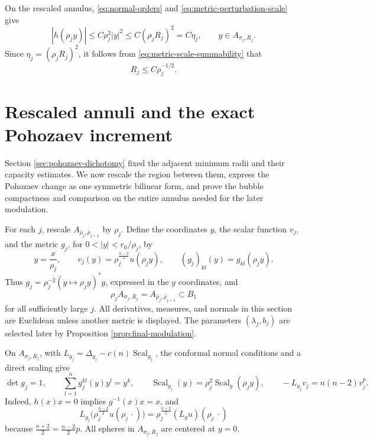 \documentclass[11pt]{article}
\numberwithin{equation}{section}
\theoremstyle{remark}
\begin{document}
{On the rescaled annulus, \eqref{eq:normal-orders} and
\eqref{eq:metric-perturbation-scale} give}
\[
 |h(\rho_jy)|
 \le C\rho_j^2|y|^2
 \le C(\rho_jR_j)^2
 =C\eta_j,
 \qquad y\in A_{\sigma_j,R_j}.
\]
{Since
\(\eta_j=(\rho_jR_j)^2\), it follows from
\eqref{eq:metric-scale-summability} that}
\begin{equation}\label{eq:outer-radius-rho-bound}
 R_j\le C\rho_j^{-1/2}.
\end{equation}

\section{Rescaled annuli and the exact Pohozaev increment}
\label{sec:euclidean-annuli}

{
Section  \ref{sec:pohozaev-dichotomy} fixed the adjacent minimum radii and
their capacity estimates.  We now rescale the region between them, express
the Pohozaev change as one symmetric bilinear form, and prove the bubble
compactness and comparison on the entire annulus needed for the later modulation.
}


For each \(j\), rescale
\(A_{\bar\rho_j,\bar\rho_{j-1}}\) by \(\rho_j\). Define the coordinates
\(y\), the scalar function \(v_j\), and the metric \(g_j\), for
\(0<|y|<r_0/\rho_j\), by
\begin{equation}\label{eq:annular-rescaling}
 y=\frac{x}{\rho_j},\qquad
 v_j(y)=\rho_j^{\frac{n-2}{2}}u(\rho_jy),\qquad
 (g_j)_{kl}(y)=g_{kl}(\rho_jy).
\end{equation}
Thus \(g_j=\rho_j^{-2}(y\mapsto\rho_jy)^*g\), expressed in the
\(y\) coordinates, and
\[
 \rho_j A_{\sigma_j,R_j}=A_{\bar\rho_j,\bar\rho_{j-1}}\subset B_1
\]
for all sufficiently large \(j\).  All derivatives, measures, and normals
in this section are Euclidean unless another metric is displayed.
The parameters \((\lambda_j,b_j)\) are selected later by
Proposition  \ref{prop:final-modulation}.

On \(A_{\sigma_j,R_j}\), with
\(L_{g_j}=\Delta_{g_j}-c(n)\operatorname{Scal}_{g_j}\), {the conformal normal conditions and a direct scaling give}
\begin{equation}\label{eq:scaled-gauge-equation}
 \det g_j=1,\qquad
 \sum_{l=1}^ng_j^{kl}(y)y^l=y^k,\qquad
 \operatorname{Scal}_{g_j}(y)=\rho_j^2\operatorname{Scal}_g(\rho_jy),\qquad
 -L_{g_j}v_j=n(n-2)v_j^p.
\end{equation}
Indeed, \(h(x)x=0\) implies \(g^{-1}(x)x=x\), and
\[
 L_{g_j}\bigl(\rho_j^{\frac{n-2}{2}}u(\rho_j\,\cdot)\bigr)
 =\rho_j^{\frac{n+2}{2}}(L_gu)(\rho_j\,\cdot)
\]
because \(\frac{n+2}{2}=\frac{n-2}{2}p\). All spheres in
\(A_{\sigma_j,R_j}\) are centered at \(y=0\).
\end{document}
